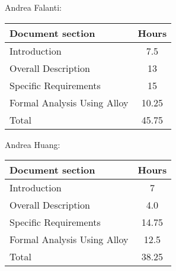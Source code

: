 Andrea Falanti:

\begin{tabular}{|l|c|}
    \hline
    Document section & Hours \\
    \hline
     Introduction & 7.5\\
     Overall Description & 13\\
     Specific Requirements & 15\\
     Formal Analysis Using Alloy & 10.25\\
     \hline
     Total & 45.75\\
     \hline
\end{tabular}
\vskip 0.3in

Andrea Huang:

\begin{tabular}{|l|c|}
    \hline
    Document section & Hours \\
    \hline
     Introduction &  7\\
     Overall Description & 4.0\\
     Specific Requirements & 14.75\\
     Formal Analysis Using Alloy & 12.5\\
     \hline
     Total & 38.25\\
     \hline
\end{tabular}